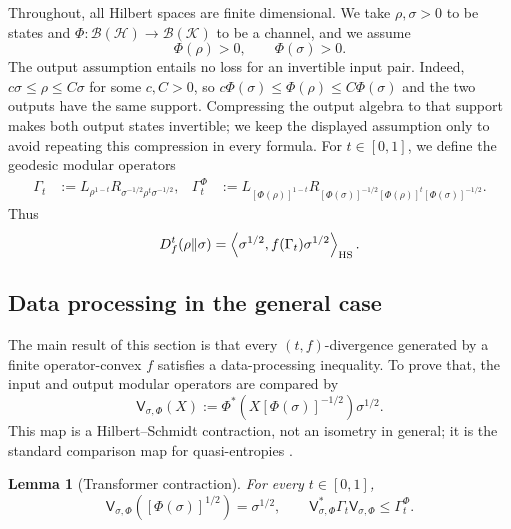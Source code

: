 \documentclass[11pt]{article}
\newtheorem{lemma}[lemma]{Lemma}
\theoremstyle{remark}
\newcommand{\1}{\mathbbm{1}}
\begin{document}
Throughout, all Hilbert spaces are finite dimensional.  We take
$\rho,\sigma>0$ to be states and
$\Phi:\mathcal B(\mathcal H)\to\mathcal B(\mathcal K)$ to be a
channel, and we assume
\begin{equation}
 \Phi(\rho)>0,\qquad \Phi(\sigma)>0.
\end{equation}
The output assumption entails no loss for an invertible input pair.
Indeed, $c\sigma\leq\rho\leq C\sigma$ for some $c,C>0$, so
$c\Phi(\sigma)\leq\Phi(\rho)\leq C\Phi(\sigma)$ and the two outputs
have the same support.  Compressing the output algebra to that support
makes both output states invertible; we keep the displayed assumption
only to avoid repeating this compression in every formula.
For $t\in[0,1]$, we define the geodesic modular operators
\begin{align}
 \Gamma_t
 &:=L_{\rho^{1-t}}
 R_{\sigma^{-1/2}\rho^t\sigma^{-1/2}},&
 \Gamma_t^\Phi
 &:=L_{[\Phi(\rho)]^{1-t}}
 R_{[\Phi(\sigma)]^{-1/2}[\Phi(\rho)]^t[\Phi(\sigma)]^{-1/2}}.
 \label{eq:consolidated-modular-operators}
\end{align}
Thus
\begin{equation}
 D_f^t(\rho\Vert\sigma)
 =\left\langle\sigma^{1/2},
 f(\Gamma_t)\sigma^{1/2}\right\rangle_{\rm HS}.
 \label{eq:consolidated-Dft}
\end{equation}

\subsection{Data processing in the general case}

The main result of this section is that every $(t,f)$-divergence
generated by a finite operator-convex $f$ satisfies a data-processing
inequality. To prove that, the input and output modular operators are compared by
\begin{equation}
 \mathsf V_{\sigma,\Phi}(X)
 :=\Phi^*(X[\Phi(\sigma)]^{-1/2})\sigma^{1/2}.
 \label{eq:consolidated-V}
\end{equation}
This map is a Hilbert--Schmidt contraction, not an isometry in
general; it is the standard comparison map for quasi-entropies
\cite{petz1986quasi,hiai2011quantum}.

\begin{lemma}[Transformer contraction]
\label{lem:consolidated-transformer}
For every $t\in[0,1]$,
\begin{equation}
 \mathsf V_{\sigma,\Phi}([\Phi(\sigma)]^{1/2})=\sigma^{1/2},
 \qquad
 \mathsf V_{\sigma,\Phi}^{*}\Gamma_t
 \mathsf V_{\sigma,\Phi}\leq\Gamma_t^\Phi.
 \label{eq:consolidated-transformer}
\end{equation}
\end{lemma}
\end{document}
